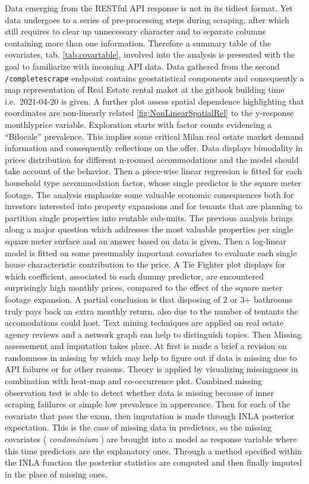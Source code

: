 \documentclass[
  12pt,
  a4paper,
  oneside]{book}
\newcommand{\passthrough}[1]{#1}
\theoremstyle{definition}
\theoremstyle{definition}
\theoremstyle{definition}
\theoremstyle{remark}
\begin{document}
Data emerging from the RESTful API response is not in its tidiest format. Yet data undergoes to a series of pre-processing steps during scraping, after which still requires to clear up unnecessary character and to separate columns containing more than one information. Therefore a summary table of the covariates, tab. \ref{tab:covartable}, involved into the analysis is presented with the goal to familiarize with incoming API data. Data gathered from the second \passthrough{\lstinline!/completescrape!} endpoint contains geostatistical components and consequently a map representation of Real Estate rental maket at the gitbook building time i.e.~2021-04-20 is given. A further plot assess spatial dependence highlighting that coordinates are non-linearly related \ref{fig:NonLinearSpatialRel} to the y-response monthlyprice variable. Exploration starts with factor counts evidencing a ``Bilocale'' prevalence. This implies some critical Milan real estate market demand information and consequently reflections on the offer. Data displays bimodality in prices distribution for different n-roomed accommodations and the model should take account of the behavior. Then a piece-wise linear regression is fitted for each household type accommodation factor, whose single predictor is the square meter footage. The analysis emphasize some valuable economic consequences both for investors interested into property expansions and for tenants that are planning to partition single properties into rentable sub-units. The previous analysis brings along a major question which addresses the most valuable properties per single square meter surface and an answer based on data is given. Then a log-linear model is fitted on some presumably important covariates to evaluate each single house characteristic contribution to the price. A Tie Fighter plot displays for which coefficient, associated to each dummy predictor, are encountered surprisingly high monthly prices, compared to the effect of the square meter footage expansion. A partial conclusion is that disposing of 2 or 3+ bathrooms truly pays back an extra monthly return, also due to the number of tentants the accomodations could host. Text mining techniques are applied on real estate agency reviews and a network graph can help to distinguish topics. Then Missing assessement and imputation takes place. At first is made a brief a revision on randomness in missing by \citet{Little} which may help to figure out if data is missing due to API failures or for other reasons. Theory is applied by visualizing missingness in combination with heat-map and co-occurrence plot. Combined missing observation test is able to detect whether data is missing because of inner scraping faiilures or simple low prevalence in appereance. Then for each of the covariate that pass the exam, then imputation is made through INLA posterior expectation. This is the case of missing data in predictors, so the missing covariates ( \emph{condominium} ) are brought into a model as response variable where this time predictors are the explanatory ones. Through a method specified within the INLA function the posterior statistics are computed and then finally imputed in the place of missing ones.
\end{document}
